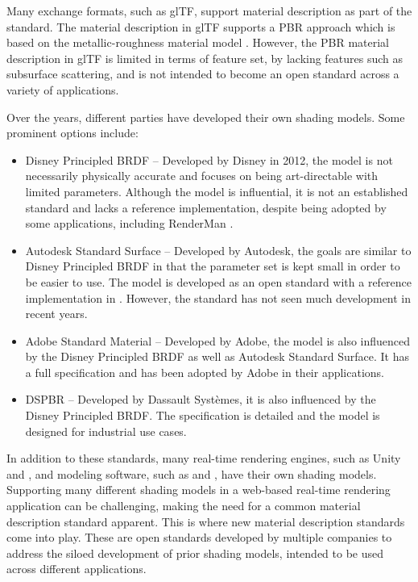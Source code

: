 Many exchange formats, such as \gls{glTF}, support material description as part of the standard. The material description in \gls{glTF} supports a \gls{PBR} approach which is based on the metallic-roughness material model \cite{gltfSpecification}. However, the \gls{PBR} material description in \gls{glTF} is limited in terms of feature set, by lacking features such as subsurface scattering, and is not intended to become an open standard across a variety of applications.

Over the years, different parties have developed their own shading models. Some prominent options include:

\begin{itemize}
    \item{Disney Principled \gls{BRDF}} \cite{disney2012pbr} – Developed by Disney in 2012, the model is not necessarily physically accurate and focuses on being art-directable with limited parameters. Although the model is influential, it is not an established standard and lacks a reference implementation, despite being adopted by some applications, including \gls{RenderMan} \cite{renderManDisneyPbrDocs}.
    \item{Autodesk Standard Surface} \cite{autodeskStandardSurface} – Developed by Autodesk, the goals are similar to Disney Principled \gls{BRDF} in that the parameter set is kept small in order to be easier to use. The model is developed as an open standard with a reference implementation in . However, the standard has not seen much development in recent years.
    \item{Adobe Standard Material} \cite{adobeStandardMaterial} – Developed by Adobe, the model is also influenced by the Disney Principled \gls{BRDF} as well as Autodesk Standard Surface. It has a full specification and has been adopted by Adobe in their applications.
    \item{\gls{DSPBR}} \cite{dspbrModel} – Developed by Dassault Systèmes, it is also influenced by the Disney Principled \gls{BRDF}. The specification is detailed and the model is designed for industrial use cases.
\end{itemize}

In addition to these standards, many real-time rendering engines, such as \gls{Unity} and , and modeling software, such as  and , have their own shading models. Supporting many different shading models in a web-based real-time rendering application can be challenging, making the need for a common material description standard apparent. This is where new material description standards come into play. These are open standards developed by multiple companies to address the siloed development of prior shading models, intended to be used across different applications.

